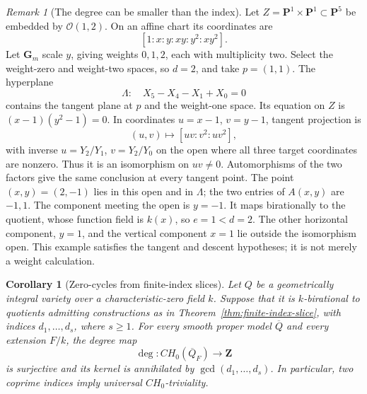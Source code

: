 \documentclass[11pt]{article}
\newtheorem{corollary}[theorem]{Corollary}
\theoremstyle{remark}
\newtheorem{remark}[theorem]{Remark}
\newcommand{\Gm}{\mathbf G_m}
\newcommand{\PP}{\mathbf P}
\newcommand{\Z}{\mathbf Z}
\begin{document}
\begin{remark}[The degree can be smaller than the index]
\label{rem:finite-index-scroll}
%
%
Let \(Z=\PP^1\times\PP^1\subset\PP^5\) be embedded by
\(\mathcal O(1,2)\).  On an affine chart its coordinates are
\[
 [1:x:y:xy:y^2:xy^2].
\]
Let \(\Gm\) scale \(y\), giving weights \(0,1,2\), each with
multiplicity two.  Select the weight-zero and weight-two spaces, so
\(d=2\), and take \(p=(1,1)\).  The hyperplane
\[
 \Lambda:\quad X_5-X_4-X_1+X_0=0
\]
contains the tangent plane at \(p\) and the weight-one space.  Its equation
on \(Z\) is \((x-1)(y^2-1)=0\).
In coordinates \(u=x-1\), \(v=y-1\), tangent projection is
\[
 (u,v)\longmapsto[uv:v^2:uv^2],
\]
with inverse \(u=Y_2/Y_1\), \(v=Y_2/Y_0\) on the open where all
three target coordinates are nonzero.  Thus it is an isomorphism on
\(uv\ne0\).  Automorphisms of the two factors give the same conclusion
at every tangent point.  The point \((x,y)=(2,-1)\) lies in this open and in
\(\Lambda\); the two entries of \(A(x,y)\) are \(-1,1\).
The component meeting the open is \(y=-1\).  It maps birationally to
the quotient, whose function field is \(k(x)\), so \(e=1<d=2\).
The other horizontal component, \(y=1\), and the vertical component
\(x=1\) lie outside the isomorphism open.  This example satisfies the
tangent and descent hypotheses; it is not merely a weight calculation.
\end{remark}

\begin{corollary}[Zero-cycles from finite-index slices]
\label{cor:finite-index-chow}
%
%
%
Let \(Q\) be a geometrically integral variety over a characteristic-zero
field \(k\).  Suppose that it is \(k\)-birational to quotients admitting
constructions as in Theorem~\ref{thm:finite-index-slice}, with indices
\(d_1,\ldots,d_s\), where \(s\geq1\).
For every smooth proper model \(\overline Q\) and every extension
\(F/k\), the degree map
\[
 \deg:CH_0(\overline Q_F)\longrightarrow\Z
\]
is surjective and its kernel is annihilated by
\(\gcd(d_1,\ldots,d_s)\).
In particular, two coprime indices imply universal \(CH_0\)-triviality.
\end{corollary}
\end{document}
